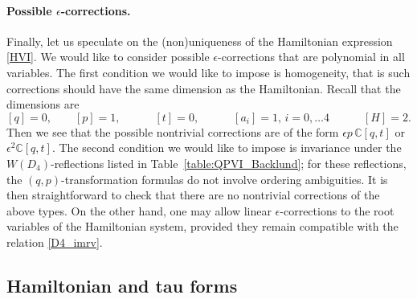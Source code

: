 \documentclass[12pt,a4paper]{article}
\numberwithin{equation}{section}
\begin{document}
\paragraph{Possible $\epsilon$-corrections.} Finally, let us speculate on the (non)uniqueness of the Hamiltonian expression \eqref{HVI}. We would like to consider possible $\epsilon$-corrections that are polynomial in all variables. The first condition we would like to impose is homogeneity, that is such corrections should have the same dimension as the Hamiltonian. Recall that the dimensions are
\begin{equation}\label{dim_VI}
[q]=0, \qquad [p]=1, \qquad \quad [t]=0, \qquad \quad  [a_i]=1,\, {\scriptstyle i=0,\ldots4} \qquad \quad [H]=2.
\end{equation}
Then we see that the possible nontrivial corrections are of the form $\epsilon p\, \mathbb{C}[q,t]$ or $\epsilon^2 \mathbb{C}[q,t]$. The second condition we would like to impose is invariance under the $W(D_4)$-reflections listed in Table~\ref{table:QPVI_Backlund}; for these reflections, the $(q,p)$-transformation formulas do not involve ordering ambiguities. It is then straightforward to check that there are no nontrivial corrections of the above types.  On the other hand, one may allow linear $\epsilon$-corrections to the root variables of the Hamiltonian system, provided they remain compatible with the relation \eqref{D4_imrv}.

\subsection{Hamiltonian and tau forms}
\label{ssec:QPVI_Ham_tau}
\end{document}
